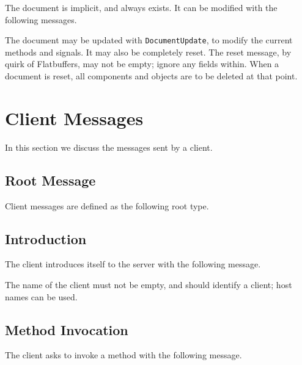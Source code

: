 \documentclass[11pt, oneside]{amsart}
\begin{document}
The document is implicit, and always exists. It can be modified with the following messages.



The document may be updated with \texttt{DocumentUpdate}, to modify the current methods and signals. It may also be completely reset. The reset message, by quirk of Flatbuffers, may not be empty; ignore any fields within. When a document is reset, all components and objects are to be deleted at that point.

\section{Client Messages}

In this section we discuss the messages sent by a client.

\subsection{Root Message}

Client messages are defined as the following root type.



\subsection{Introduction}

The client introduces itself to the server with the following message.



The name of the client must not be empty, and should identify a client; host names can be used.

\subsection{Method Invocation}
\label{sec:method_invoke}

The client asks to invoke a method with the following message.


\end{document}
